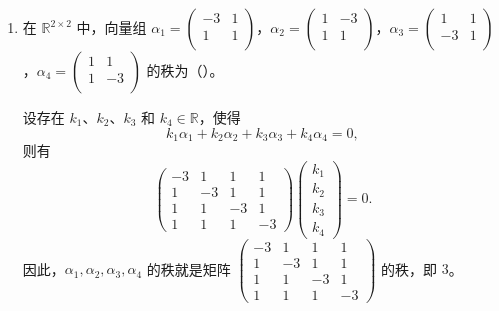 \begin{enumerate}[1~]
\begin{enumerate}[1.~]
\item
在 $\mathbb{R}^{2\times 2}$ 中，向量组 $\alpha_1=\left( \begin{smallmatrix}
	-3&		1\\
	1&		1\\
\end{smallmatrix} \right)$，$\alpha_2=\left( \begin{smallmatrix}
	1&		-3\\
	1&		1\\
\end{smallmatrix} \right) $，$\alpha_3=\left( \begin{smallmatrix}
	1&		1\\
	-3&		1\\
\end{smallmatrix} \right) $，$\alpha_4=\left( \begin{smallmatrix}
	1&		1\\
	1&		-3\\
\end{smallmatrix} \right) $ 的秩为（\quad）。
\begin{solution}
设存在 $k_1$、$k_2$、$k_3$ 和 $k_4\in\mathbb{R}$，使得
$$
k_1\alpha_1+k_2\alpha_2+k_3\alpha_3+k_4\alpha_4=0,
$$
则有
$$
\left(\begin{matrix}
-3 & 1 & 1 & 1 \\
1 & -3 & 1 & 1 \\
1 & 1 & -3 & 1 \\
1 & 1 & 1 & -3 
\end{matrix}\right)
\left(\begin{matrix}
k_1 \\
k_2 \\
k_3 \\
k_4 
\end{matrix}\right)=0.
$$
因此，$\alpha_1,\alpha_2, \alpha_3, \alpha_4$ 的秩就是矩阵 $\left(\begin{smallmatrix}
-3 & 1 & 1 & 1 \\
1 & -3 & 1 & 1 \\
1 & 1 & -3 & 1 \\
1 & 1 & 1 & -3 
\end{smallmatrix}\right)$ 的秩，即 $3$。
\end{solution}
\end{enumerate}
\end{enumerate}
\endinput
